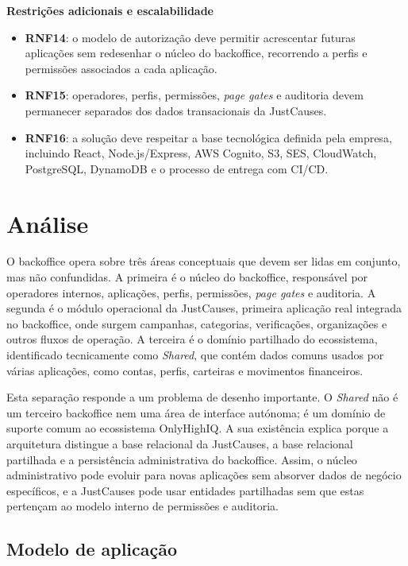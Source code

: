 \noindent\textbf{Restrições adicionais e escalabilidade}
\begin{itemize}
  \item \textbf{RNF14}: o modelo de autorização deve permitir acrescentar futuras aplicações sem redesenhar o núcleo do backoffice, recorrendo a perfis e permissões associados a cada aplicação.
  \item \textbf{RNF15}: operadores, perfis, permissões, \textit{page gates} e auditoria devem permanecer separados dos dados transacionais da JustCauses.
  \item \textbf{RNF16}: a solução deve respeitar a base tecnológica definida pela empresa, incluindo React, Node.js/Express, AWS Cognito, S3, SES, CloudWatch, PostgreSQL, DynamoDB e o processo de entrega com \gls{CI/CD}.
\end{itemize}


\section{Análise}
\label{sec:analise_dominio}

O backoffice opera sobre três áreas conceptuais que devem ser lidas em conjunto, mas não confundidas. A primeira é o núcleo do backoffice, responsável por operadores internos, aplicações, perfis, permissões, \textit{page gates} e auditoria. A segunda é o módulo operacional da JustCauses, primeira aplicação real integrada no backoffice, onde surgem campanhas, categorias, verificações, organizações e outros fluxos de operação. A terceira é o domínio partilhado do ecossistema, identificado tecnicamente como \textit{Shared}, que contém dados comuns usados por várias aplicações, como contas, perfis, carteiras e movimentos financeiros.

Esta separação responde a um problema de desenho importante. O \textit{Shared} não é um terceiro backoffice nem uma área de interface autónoma; é um domínio de suporte comum ao ecossistema OnlyHighIQ. A sua existência explica porque a arquitetura distingue a base relacional da JustCauses, a base relacional partilhada e a persistência administrativa do backoffice. Assim, o núcleo administrativo pode evoluir para novas aplicações sem absorver dados de negócio específicos, e a JustCauses pode usar entidades partilhadas sem que estas pertençam ao modelo interno de permissões e auditoria.

\subsection{Modelo de aplicação}
\label{subsec:modelo_aplicacao}

